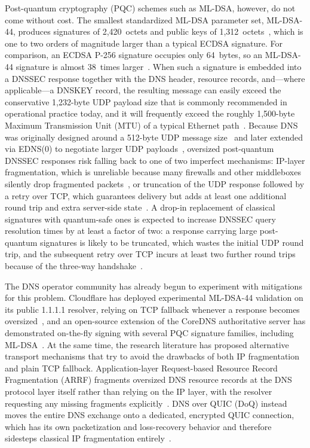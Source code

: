 \documentclass[conference]{IEEEtran}
\begin{document}
Post-quantum cryptography (PQC) schemes such as ML-DSA, however, do not come
without cost. The smallest standardized ML-DSA parameter set, ML-DSA-44,
produces signatures of 2,420~octets and public keys of
1,312~octets~\cite{fips204,mldsadraft}, which is one to two orders of magnitude
larger than a typical ECDSA signature. For comparison, an ECDSA P-256
signature occupies only 64~bytes, so an ML-DSA-44 signature is almost 38~times
larger~\cite{cloudflareblog}. When such a signature is embedded into a DNSSEC
response together with the DNS header, resource records, and---where
applicable---a DNSKEY record, the resulting message can easily exceed the
conservative 1,232-byte UDP payload size that is commonly recommended in
operational practice today, and it will frequently exceed the roughly
1,500-byte Maximum Transmission Unit (MTU) of a typical Ethernet
path~\cite{rfc6891,cloudflaremtu}. Because DNS was originally designed around a
512-byte UDP message size~\cite{rfc1035} and later extended via EDNS(0) to
negotiate larger UDP payloads~\cite{rfc6891}, oversized post-quantum DNSSEC
responses risk falling back to one of two imperfect mechanisms: IP-layer
fragmentation, which is unreliable because many firewalls and other middleboxes
silently drop fragmented packets~\cite{rfc7766,fragpoison}, or truncation of
the UDP response followed by a retry over TCP, which guarantees delivery but
adds at least one additional round trip and extra server-side
state~\cite{rfc7766}. A drop-in replacement of classical signatures with
quantum-safe ones is expected to increase DNSSEC query resolution times by at
least a factor of two: a response carrying large post-quantum signatures is
likely to be truncated, which wastes the initial UDP round trip, and the
subsequent retry over TCP incurs at least two further round trips because of
the three-way handshake~\cite{turbodns}.

The DNS operator community has already begun to experiment with mitigations for
this problem. Cloudflare has deployed experimental ML-DSA-44 validation on its
public 1.1.1.1 resolver, relying on TCP fallback whenever a response becomes
oversized~\cite{cloudflareblog}, and an open-source extension of the CoreDNS
authoritative server has demonstrated on-the-fly signing with several PQC
signature families, including ML-DSA~\cite{corednspqc,coredns}. At the same
time, the research literature has proposed alternative transport mechanisms
that try to avoid the drawbacks of both IP fragmentation and plain TCP
fallback. Application-layer Request-based Resource Record Fragmentation (ARRF)
fragments oversized DNS resource records at the DNS protocol layer itself
rather than relying on the IP layer, with the resolver requesting any missing
fragments explicitly~\cite{arrf}. DNS over QUIC (DoQ) instead moves the entire
DNS exchange onto a dedicated, encrypted QUIC connection, which has its own
packetization and loss-recovery behavior and therefore sidesteps classical IP
fragmentation entirely~\cite{rfc9250}.
\end{document}
